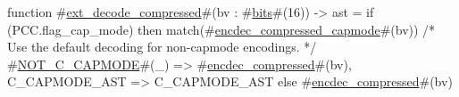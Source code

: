 function #\hyperref[sailRISCVzextzydecodezycompressed]{ext\_decode\_compressed}#(bv : #\hyperref[sailRISCVzbits]{bits}#(16)) -> ast = {
  if (PCC.flag_cap_mode) then {
    match(#\hyperref[sailRISCVzencdeczycompressedzycapmode]{encdec\_compressed\_capmode}#(bv)) {
      /* Use the default decoding for non-capmode encodings. */
      #\hyperref[sailRISCVzNOTzyCzyCAPMODE]{NOT\_C\_CAPMODE}#(_) => #\hyperref[sailRISCVzencdeczycompressed]{encdec\_compressed}#(bv),
      C_CAPMODE_AST => C_CAPMODE_AST
    }
  } else #\hyperref[sailRISCVzencdeczycompressed]{encdec\_compressed}#(bv)
}
